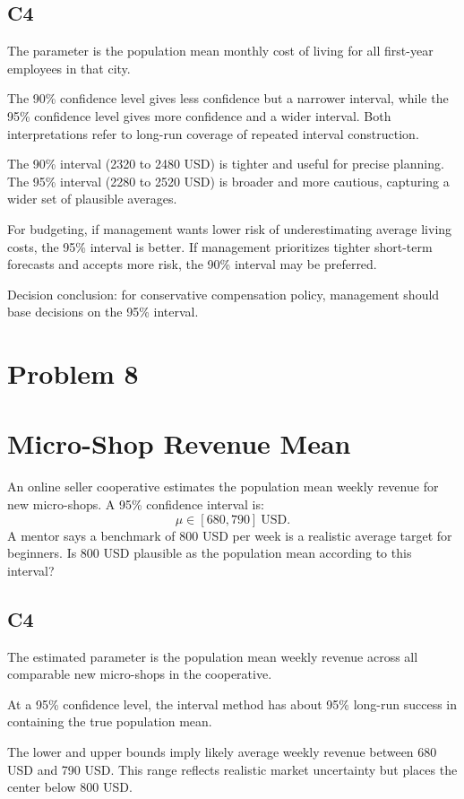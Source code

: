\begin{ExamProblems}
		\subsection*{C4}
		The parameter is the population mean monthly cost of living for all first-year employees in that city.

		The 90\% confidence level gives less confidence but a narrower interval, while the 95\% confidence level gives more confidence and a wider interval.
		Both interpretations refer to long-run coverage of repeated interval construction.

		The 90\% interval (2320 to 2480 USD) is tighter and useful for precise planning.
		The 95\% interval (2280 to 2520 USD) is broader and more cautious, capturing a wider set of plausible averages.

		For budgeting, if management wants lower risk of underestimating average living costs, the 95\% interval is better.
		If management prioritizes tighter short-term forecasts and accepts more risk, the 90\% interval may be preferred.

		Decision conclusion: for conservative compensation policy, management should base decisions on the 95\% interval.

		\newpage
		\item
		\section{Problem 8}
		\section{Micro-Shop Revenue Mean}
		An online seller cooperative estimates the population mean weekly revenue for new micro-shops.
		A 95\% confidence interval is:
		\[
		\mu \in [680, 790]\ \text{USD}.
		\]
		A mentor says a benchmark of 800 USD per week is a realistic average target for beginners.
		Is 800 USD plausible as the population mean according to this interval?

		\subsection*{C4}
		The estimated parameter is the population mean weekly revenue across all comparable new micro-shops in the cooperative.

		At a 95\% confidence level, the interval method has about 95\% long-run success in containing the true population mean.

		The lower and upper bounds imply likely average weekly revenue between 680 USD and 790 USD.
		This range reflects realistic market uncertainty but places the center below 800 USD.


\end{ExamProblems}

